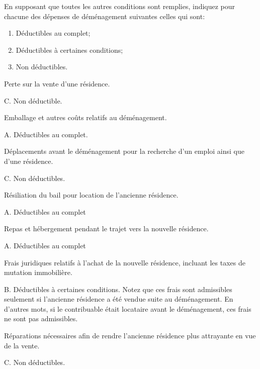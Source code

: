 \begin{question}
	En supposant que toutes les autres conditions sont remplies, indiquez pour chacune des dépenses de déménagement suivantes celles qui sont:
	\begin{enumerate}[label=\Alph*.]
		\item Déductibles au complet;
		\item Déductibles à certaines conditions;
		\item Non déductibles.
	\end{enumerate}
\end{question}
\setcounter{sousQuestion}{0}
\begin{sousQuestion}
	Perte sur la vente d'une résidence.
\end{sousQuestion}
C. Non déductible.

\begin{sousQuestion}
	Emballage et autres coûts relatifs au déménagement.
\end{sousQuestion}
A. Déductibles au complet.

\begin{sousQuestion}
	Déplacements avant le déménagement pour la recherche d'un emploi ainsi que d'une résidence.
\end{sousQuestion}
C.  Non déductibles.

\begin{sousQuestion}
	Résiliation du bail pour location de l'ancienne résidence.
\end{sousQuestion}
A.  Déductibles au complet

\begin{sousQuestion}
	Repas et hébergement pendant le trajet vers la nouvelle résidence.
\end{sousQuestion}
A.  Déductibles au complet

\begin{sousQuestion}
	Frais juridiques relatifs à l'achat de la nouvelle résidence, incluant les taxes de mutation immobilière. 
\end{sousQuestion}
B.  Déductibles à certaines conditions. Notez que ces frais sont admissibles seulement si l'ancienne résidence a été vendue suite au déménagement. En d'autres mots, si le contribuable était locataire avant le déménagement, ces frais ne sont pas admissibles.

\begin{sousQuestion}
	Réparations nécessaires afin de rendre l'ancienne résidence plus attrayante en vue de la vente.
\end{sousQuestion}
C.  Non déductibles.

